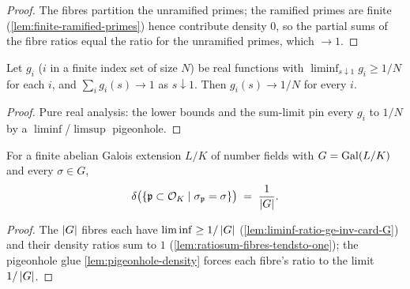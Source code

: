 \begin{proof}
  The fibres partition the unramified primes; the ramified primes are
  finite (\cref{lem:finite-ramified-primes}) hence contribute density
  $0$, so the partial sums of the fibre ratios equal the ratio for the
  unramified primes, which $\to 1$.
\end{proof}

\begin{lemma}\label{lem:pigeonhole-density}
  Let $g_i$ ($i$ in a finite index set of size $N$) be real functions
  with $\liminf_{s\downarrow 1} g_i \ge 1/N$ for each $i$, and
  $\sum_i g_i(s) \to 1$ as $s\downarrow 1$. Then $g_i(s) \to 1/N$ for
  every $i$.
\end{lemma}

\begin{proof}
  Pure real analysis: the lower bounds and the sum-limit pin every
  $g_i$ to $1/N$ by a $\liminf$/$\limsup$ pigeonhole.
\end{proof}

\begin{theorem}\label{thm:chebotarev-abelian}
  For a finite abelian Galois extension $L/K$ of number fields with
  $G=\mathrm{Gal}(L/K)$ and every $\sigma\in G$,
  \[
    \delta\bigl(\left\{ \mathfrak{p}\subset\mathcal{O}_K \;\middle|\; \sigma_{\mathfrak{p}} = \sigma \right\}\bigr)
    \;=\; \frac{1}{\left\lvert G \right\rvert}.
  \]
\end{theorem}

\begin{proof}
  \leanok
  The $\left\lvert G \right\rvert$ fibres each have $\liminf \ge 1/\left\lvert G \right\rvert$
  (\cref{lem:liminf-ratio-ge-inv-card-G}) and their density ratios sum
  to $1$ (\cref{lem:ratiosum-fibres-tendsto-one}); the pigeonhole glue
  \cref{lem:pigeonhole-density} forces each fibre's ratio to the limit
  $1/\left\lvert G \right\rvert$.
\end{proof}
